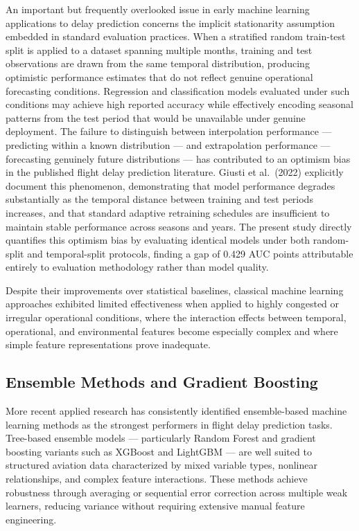 \documentclass{report}
\begin{document}
An important but frequently overlooked issue in early machine learning
applications to delay prediction concerns the implicit stationarity assumption
embedded in standard evaluation practices. When a stratified random train-test
split is applied to a dataset spanning multiple months, training and test
observations are drawn from the same temporal distribution, producing optimistic
performance estimates that do not reflect genuine operational forecasting
conditions. Regression and classification models evaluated under such conditions
may achieve high reported accuracy while effectively encoding seasonal patterns
from the test period that would be unavailable under genuine deployment. The
failure to distinguish between interpolation performance --- predicting within
a known distribution --- and extrapolation performance --- forecasting genuinely
future distributions --- has contributed to an optimism bias in the published
flight delay prediction literature. Giusti et al.\ (2022) explicitly document
this phenomenon, demonstrating that model performance degrades substantially as
the temporal distance between training and test periods increases, and that
standard adaptive retraining schedules are insufficient to maintain stable
performance across seasons and years. The present study directly quantifies
this optimism bias by evaluating identical models under both random-split and
temporal-split protocols, finding a gap of 0.429 AUC points attributable
entirely to evaluation methodology rather than model quality.


Despite their improvements over statistical baselines, classical machine learning approaches exhibited limited effectiveness when applied to highly congested or irregular operational conditions, where the interaction effects between temporal, operational, and environmental features become especially complex and where simple feature representations prove inadequate.

\subsection{Ensemble Methods and Gradient Boosting}

More recent applied research has consistently identified ensemble-based machine learning methods as the strongest performers in flight delay prediction tasks. Tree-based ensemble models --- particularly Random Forest and gradient boosting variants such as XGBoost and LightGBM --- are well suited to structured aviation data characterized by mixed variable types, nonlinear relationships, and complex feature interactions. These methods achieve robustness through averaging or sequential error correction across multiple weak learners, reducing variance without requiring extensive manual feature engineering.
\end{document}
